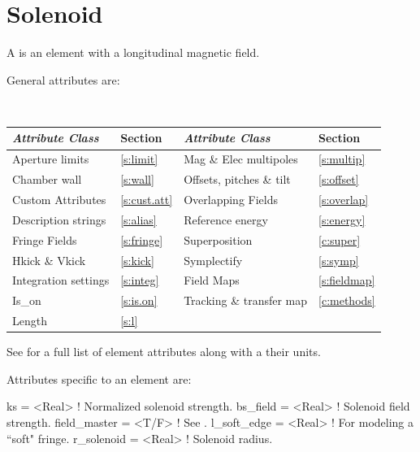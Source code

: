 {\newpage

\section{Solenoid}
\label{s:sol}

A  is an element with a longitudinal magnetic field.

General  attributes are:
\begin{center}
\tt
\begin{tabular}{llll} \toprule
  {\sl Attribute Class}      & Section           & {\sl Attribute Class}      & Section            \\ \midrule
  Aperture limits            & \ref{s:limit}     & Mag \& Elec multipoles     & \ref{s:multip}     \\
  Chamber wall               & \ref{s:wall}      & Offsets, pitches \& tilt   & \ref{s:offset}     \\
  Custom Attributes          & \ref{s:cust.att}  & Overlapping Fields         & \ref{s:overlap}    \\
  Description strings        & \ref{s:alias}     & Reference energy           & \ref{s:energy}     \\ 
  Fringe Fields              & \ref{s:fringe}    & Superposition              & \ref{c:super}      \\
  Hkick \& Vkick             & \ref{s:kick}      & Symplectify                & \ref{s:symp}       \\
  Integration settings       & \ref{s:integ}     & Field Maps                 & \ref{s:fieldmap}   \\
  Is_on                      & \ref{s:is.on}     & Tracking \& transfer map   & \ref{c:methods}    \\ 
  Length                     & \ref{s:l}         &                            &                    \\ 
  \bottomrule
\end{tabular}
\end{center}
\toffset
See  for a full list of element attributes along with a their units.

Attributes specific to an  element are:
\begin{example}
  ks           = <Real>  ! Normalized solenoid strength.
  bs_field     = <Real>  ! Solenoid field strength.
  field_master = <T/F>   ! See .
  l_soft_edge  = <Real>  ! For modeling a ``soft" fringe.
  r_solenoid   = <Real>  ! Solenoid radius.
\end{example}

}

